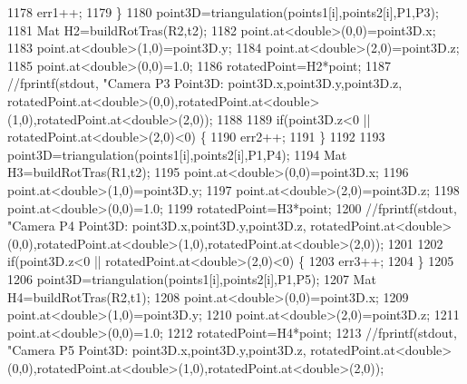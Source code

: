 \begin{DoxyCode}
1178                  err1++;                 
1179              \}
1180              point3D=triangulation(points1[i],points2[i],P1,P3);
1181              Mat H2=buildRotTras(R2,t2);
1182              point.at<\textcolor{keywordtype}{double}>(0,0)=point3D.x;
1183              point.at<\textcolor{keywordtype}{double}>(1,0)=point3D.y;
1184              point.at<\textcolor{keywordtype}{double}>(2,0)=point3D.z;
1185              point.at<\textcolor{keywordtype}{double}>(0,0)=1.0;
1186              rotatedPoint=H2*point;  
1187              \textcolor{comment}{//fprintf(stdout, "Camera P3 Point3D: %
       point3D.x,point3D.y,point3D.z, rotatedPoint.at<double>(0,0),rotatedPoint.at<double>(1,0),rotatedPoint.at<double>(2,0));}
1188 
1189              \textcolor{keywordflow}{if}(point3D.z<0 || rotatedPoint.at<\textcolor{keywordtype}{double}>(2,0)<0) \{
1190                  err2++;                 
1191              \}
1192                           
1193              point3D=triangulation(points1[i],points2[i],P1,P4);   
1194              Mat H3=buildRotTras(R1,t2);
1195              point.at<\textcolor{keywordtype}{double}>(0,0)=point3D.x;
1196              point.at<\textcolor{keywordtype}{double}>(1,0)=point3D.y;
1197              point.at<\textcolor{keywordtype}{double}>(2,0)=point3D.z;
1198              point.at<\textcolor{keywordtype}{double}>(0,0)=1.0;
1199              rotatedPoint=H3*point;
1200              \textcolor{comment}{//fprintf(stdout, "Camera P4 Point3D: %
       point3D.x,point3D.y,point3D.z, rotatedPoint.at<double>(0,0),rotatedPoint.at<double>(1,0),rotatedPoint.at<double>(2,0));}
1201 
1202              \textcolor{keywordflow}{if}(point3D.z<0 || rotatedPoint.at<\textcolor{keywordtype}{double}>(2,0)<0) \{
1203                  err3++;                 
1204              \} 
1205              
1206              point3D=triangulation(points1[i],points2[i],P1,P5);
1207              Mat H4=buildRotTras(R2,t1);
1208              point.at<\textcolor{keywordtype}{double}>(0,0)=point3D.x;
1209              point.at<\textcolor{keywordtype}{double}>(1,0)=point3D.y;
1210              point.at<\textcolor{keywordtype}{double}>(2,0)=point3D.z;
1211              point.at<\textcolor{keywordtype}{double}>(0,0)=1.0;
1212              rotatedPoint=H4*point;
1213              \textcolor{comment}{//fprintf(stdout, "Camera P5 Point3D: %
       point3D.x,point3D.y,point3D.z, rotatedPoint.at<double>(0,0),rotatedPoint.at<double>(1,0),rotatedPoint.at<double>(2,0));}

\end{DoxyCode}
